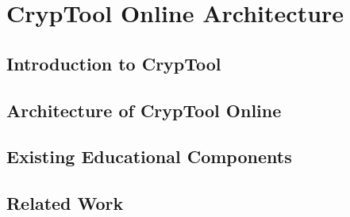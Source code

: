 \section{CrypTool Online Architecture}
\label{chap:ctoArchitecture}

\subsection{Introduction to CrypTool}
\label{sec:introCryptool}

\subsection{Architecture of CrypTool Online}
\label{sec:ctoArchitectureDetail}

\subsection{Existing Educational Components}
\label{sec:existingEducationalComponents}

\subsection{Related Work}
\label{sec:relatedWork}
